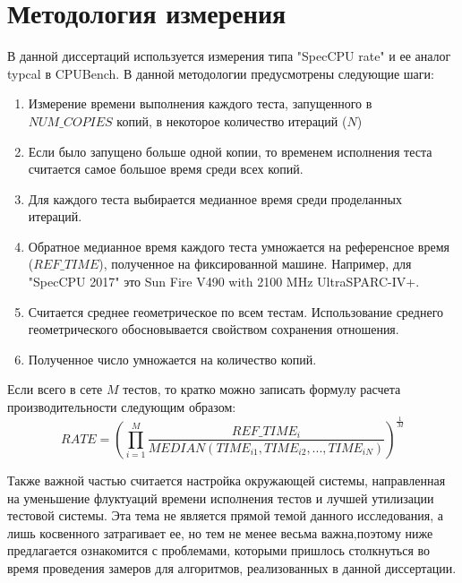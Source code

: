 \section{Методология измерения}\label{p1:method}
В данной диссертаций используется измерения типа  "SpecCPU rate"\phantom{} и ее аналог typcal в CPUBench. В данной методологии предусмотрены следующие шаги:
\begin{enumerate} 
		\item Измерение времени выполнения каждого теста, запущенного в $NUM\_COPIES$ копий, в некоторое количество итераций ($N$)
		\item Если было запущено больше одной копии, то временем исполнения теста считается самое большое время среди всех копий.
		\item Для каждого теста выбирается медианное время среди проделанных итераций. 
		\item Обратное медианное время каждого теста умножается на референсное время ($REF\_TIME$), полученное на фиксированной машине. Например, для "SpecCPU 2017"\phantom{} это  Sun Fire V490 with 2100 MHz UltraSPARC-IV+.
		\item Считается среднее геометрическое по всем тестам. Использование среднего геометрического обосновывается свойством сохранения отношения.
		\item Полученное число умножается на количество копий.
\end{enumerate}
Если всего в сете $M$ тестов, то кратко можно записать формулу расчета производительности следующим образом:
\begin{equation}
RATE =\left(\prod _{i=1}^{M}\dfrac{REF\_TIME_i}{MEDIAN(TIME_{i1}, TIME_{i2}, ... , TIME_{iN})}\right)^{\frac {1}{M}} 
\end{equation}

Также важной частью считается настройка окружающей системы, направленная на уменьшение флуктуаций времени исполнения тестов и лучшей утилизации тестовой системы.
Эта тема не является прямой темой данного исследования, а лишь косвенного затрагивает ее, но тем не менее весьма важна,поэтому ниже предлагается ознакомится с проблемами, которыми пришлось столкнуться во  время проведения замеров для алгоритмов, реализованных в данной диссертации.  

